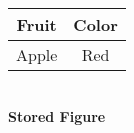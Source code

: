 \begingroup
	\newsavebox{\tableBox}
	\begin{lrbox}{\tableBox}
		\begin{tabular}{|c|c|} \hline
			\textbf{Fruit} & \textbf{Color} \\ \hline
			Apple & Red \\ \hline
		\end{tabular}
	\end{lrbox}

	\begin{center}
		\usebox{\tableBox}\\[3pt]
		\textbf{Stored Figure}
	\end{center}
\endgroup